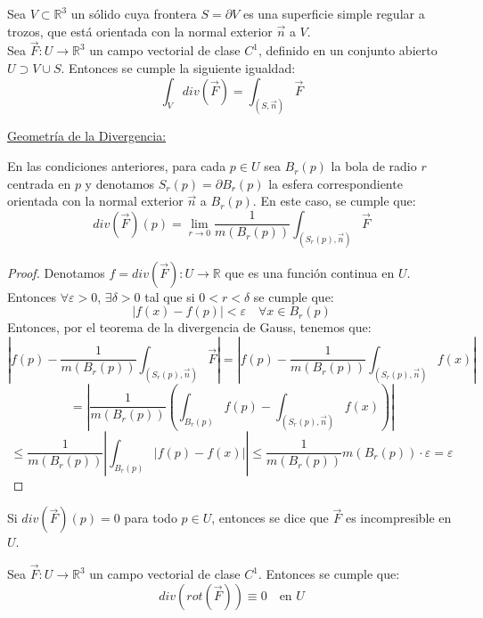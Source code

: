 \begin{teorema} 
    Sea $V \subset \mathbb{R}^3$ un sólido cuya frontera $S = \partial V$ es una superficie simple regular a trozos, que está orientada con la normal exterior $\vec{n}$ a $V$.\\
    Sea $\vec{F} : U \to \mathbb{R}^3$ un campo vectorial de clase $C^1$, definido en un conjunto abierto $U \supset V \cup S$. Entonces se cumple la siguiente igualdad:
    $$ \int_{V} div(\vec{F}) = \int_{(S, \vec{n})} \vec{F}$$
\end{teorema}

\underline{Geometría de la Divergencia:}\\
\begin{corolario}
    En las condiciones anteriores, para cada $p \in U$ sea $B_r(p)$ la bola de radio $r$ centrada en $p$ y denotamos $S_r(p) = \partial B_r(p)$ la esfera correspondiente orientada con la normal exterior $\vec{n}$ a $B_r(p)$. En este caso, se cumple que:
    $$ div(\vec{F})(p) = \lim_{r \to 0} \frac{1}{m(B_r(p))} \int_{(S_r(p), \vec{n})} \vec{F}$$ 
\end{corolario}

\begin{proof}
    Denotamos $f = div(\vec{F}) : U \to \mathbb{R}$ que es una función continua en $U$.\\
    Entonces $\forall \varepsilon > 0$, $\exists \delta > 0$ tal que si $0 < r < \delta$ se cumple que:
    $$ \left| f(x) - f(p) \right| < \varepsilon \quad \forall x \in B_r(p)$$
    Entonces, por el teorema de la divergencia de Gauss, tenemos que:
    $$ \left| f(p) - \frac{1}{m(B_r(p))} \int_{(S_r(p), \vec{n})} \vec{F} \right| = \left| f(p) - \frac{1}{m(B_r(p))} \int_{(S_r(p), \vec{n})} f(x) \right|$$
    $$ = \left| \frac{1}{m(B_r(p))} \left( \int_{B_r(p)} f(p) - \int_{(S_r(p), \vec{n})} f(x) \right) \right|$$
    $$ \leq \frac{1}{m(B_r(p))} \left| \int_{B_r(p)} \left| f(p) - f(x) \right| \right| \leq \frac{1}{m(B_r(p))} m(B_r(p)) \cdot \varepsilon = \varepsilon$$
\end{proof}

\begin{observación}
    Si $div(\vec{F})(p) = 0$ para todo $p \in U$, entonces se dice que $\vec{F}$ es incompresible en $U$.
\end{observación}

\begin{observación}
    Sea $\vec{F} : U \to \mathbb{R}^3$ un campo vectorial de clase $C^1$. Entonces se cumple que:
    $$ div(rot(\vec{F})) \equiv 0 \quad \text{en } U$$
\end{observación}

